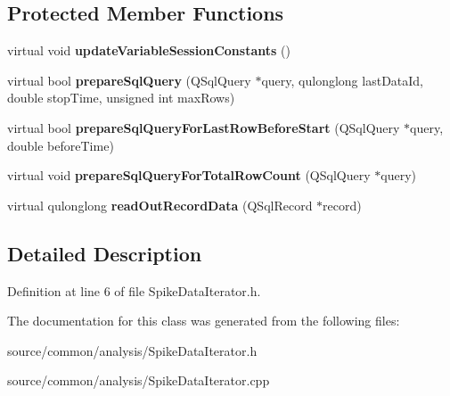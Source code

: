 \subsection*{Protected Member Functions}
\begin{DoxyCompactItemize}
\item 
\hypertarget{class_picto_1_1_spike_data_iterator_a05df6f59a23aad5a354d3c67d5a38953}{virtual void {\bfseries update\-Variable\-Session\-Constants} ()}\label{class_picto_1_1_spike_data_iterator_a05df6f59a23aad5a354d3c67d5a38953}

\item 
\hypertarget{class_picto_1_1_spike_data_iterator_a1f8b3e20412f3c5682f8d538915c4ea8}{virtual bool {\bfseries prepare\-Sql\-Query} (Q\-Sql\-Query $\ast$query, qulonglong last\-Data\-Id, double stop\-Time, unsigned int max\-Rows)}\label{class_picto_1_1_spike_data_iterator_a1f8b3e20412f3c5682f8d538915c4ea8}

\item 
\hypertarget{class_picto_1_1_spike_data_iterator_a1f4c482dbe8c10e9506f424519a95f38}{virtual bool {\bfseries prepare\-Sql\-Query\-For\-Last\-Row\-Before\-Start} (Q\-Sql\-Query $\ast$query, double before\-Time)}\label{class_picto_1_1_spike_data_iterator_a1f4c482dbe8c10e9506f424519a95f38}

\item 
\hypertarget{class_picto_1_1_spike_data_iterator_a9f927b831e73ab041db5f038a9e58583}{virtual void {\bfseries prepare\-Sql\-Query\-For\-Total\-Row\-Count} (Q\-Sql\-Query $\ast$query)}\label{class_picto_1_1_spike_data_iterator_a9f927b831e73ab041db5f038a9e58583}

\item 
\hypertarget{class_picto_1_1_spike_data_iterator_a549862b9198ff96a859f67dd423fb63e}{virtual qulonglong {\bfseries read\-Out\-Record\-Data} (Q\-Sql\-Record $\ast$record)}\label{class_picto_1_1_spike_data_iterator_a549862b9198ff96a859f67dd423fb63e}

\end{DoxyCompactItemize}


\subsection{Detailed Description}


Definition at line 6 of file Spike\-Data\-Iterator.\-h.



The documentation for this class was generated from the following files\-:\begin{DoxyCompactItemize}
\item 
source/common/analysis/Spike\-Data\-Iterator.\-h\item 
source/common/analysis/Spike\-Data\-Iterator.\-cpp\end{DoxyCompactItemize}
